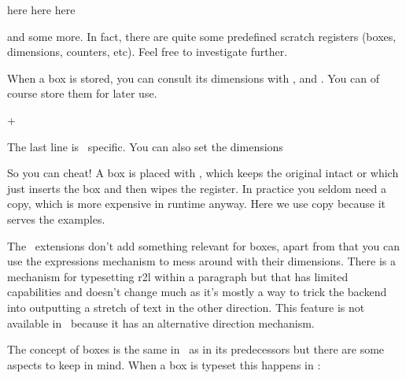 \starttyping
\setbox\scratchbox   \hbox{here}
\setbox\scratchboxone\hbox{here}
\setbox\scratchboxtwo\hbox{here}
\stoptyping

and some more. In fact, there are quite some predefined scratch registers (boxes,
dimensions, counters, etc). Feel free to investigate further.

When a box is stored, you can consult its dimensions with \type {\wd}, \type
{\ht} and \type {\dp}. You can of course store them for later use.

\starttyping
\scratchwidth \wd\scratchbox
\scratchheight\ht\scratchbox
\scratchdepth \dp\scratchbox
\scratchtotal \dimexpr\ht\scratchbox+\dp\scratchbox\relax
\scratchtotal \htdp\scratchbox
\stoptyping

The last line is \CONTEXT\ specific. You can also set the dimensions

\starttyping
\wd\scratchbox 10cm
\ht\scratchbox 10mm
\dp\scratchbox  5mm
\stoptyping

So you can cheat! A box is placed with \type {\copy}, which keeps the original
intact or \type {\box} which just inserts the box and then wipes the register. In
practice you seldom need a copy, which is more expensive in runtime anyway. Here
we use copy because it serves the examples.

\starttyping
\copy\scratchbox
\box \scratchbox
\stoptyping

\stopsectionlevel

\startsectionlevel[title={\ETEX\ primitives}]

The \ETEX\ extensions don't add something relevant for boxes, apart from that you
can use the expressions mechanism to mess around with their dimensions. There is
a mechanism for typesetting r2l within a paragraph but that has limited
capabilities and doesn't change much as it's mostly a way to trick the backend
into outputting a stretch of text in the other direction. This feature is not
available in \LUATEX\ because it has an alternative direction mechanism.

\stopsectionlevel

\startsectionlevel[title={\LUATEX\ primitives}]

The concept of boxes is the same in \LUATEX\ as in its predecessors but there are
some aspects to keep in mind. When a box is typeset this happens in \LUATEX:

